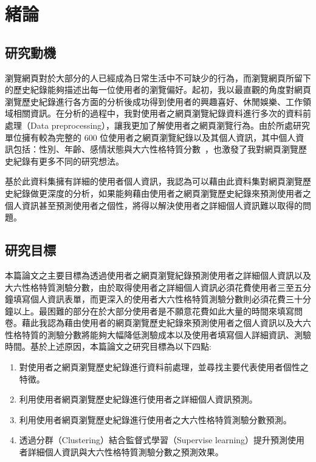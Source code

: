 \chapter{緒論}
\section{研究動機}
{
瀏覽網頁對於大部分的人已經成為日常生活中不可缺少的行為，而瀏覽網頁所留下的歷史紀錄能夠描述出每一位使用者的瀏覽偏好。起初，我以最直觀的角度對網頁瀏覽歷史紀錄進行各方面的分析後成功得到使用者的興趣喜好、休閒娛樂、工作領域相關資訊。在分析的過程中，我對使用者之網頁瀏覽紀錄資料進行多次的資料前處理（Data preprocessing），讓我更加了解使用者之網頁瀏覽行為。由於所處研究單位擁有較為完整的 $600$ 位使用者之網頁瀏覽紀錄以及其個人資訊，其中個人資訊包括：性別、年齡、感情狀態與大六性格特質分數~\cite{greaves2015regional}，也激發了我對網頁瀏覽歷史紀錄有更多不同的研究想法。\par
基於此資料集擁有詳細的使用者個人資訊，我認為可以藉由此資料集對網頁瀏覽歷史紀錄做更深度的分析，如果能夠藉由使用者之網頁瀏覽歷史紀錄來預測使用者之個人資訊甚至預測使用者之個性，將得以解決使用者之詳細個人資訊難以取得的問題。
}

\section{研究目標}
{
本篇論文之主要目標為透過使用者之網頁瀏覽紀錄預測使用者之詳細個人資訊以及大六性格特質測驗分數，由於取得使用者之詳細個人資訊必須花費使用者三至五分鐘填寫個人資訊表單，而更深入的使用者大六性格特質測驗分數則必須花費三十分鐘以上。最困難的部分在於大部分使用者是不願意花費如此大量的時間來填寫問卷。藉此我認為藉由使用者的網頁瀏覽歷史紀錄來預測使用者之個人資訊以及大六性格特質的測驗分數將能夠大幅降低測驗成本以及使用者填寫個人詳細資訊、測驗時間。基於上述原因，本篇論文之研究目標為以下四點:
\begin{enumerate}
\item 對使用者之網頁瀏覽歷史紀錄進行資料前處理，並尋找主要代表使用者個性之特徵。
\item 利用使用者網頁瀏覽歷史紀錄進行使用者之詳細個人資訊預測。
\item 利用使用者網頁瀏覽歷史紀錄進行使用者之大六性格特質測驗分數預測。
\item 透過分群（Clustering）結合監督式學習（Supervise learning）提升預測使用者詳細個人資訊與大六性格特質測驗分數之預測效果。
\end{enumerate}
}

